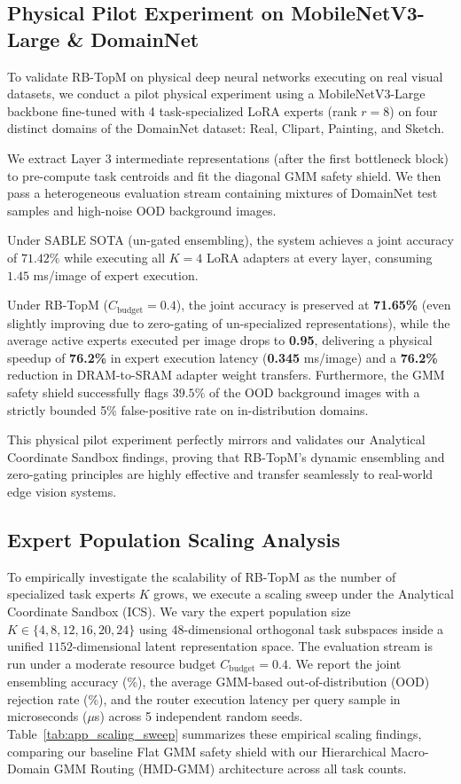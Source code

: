 \documentclass{article}
\theoremstyle{plain}
\theoremstyle{definition}
\theoremstyle{remark}
\begin{document}
\subsection{Physical Pilot Experiment on MobileNetV3-Large \& DomainNet}
To validate RB-TopM on physical deep neural networks executing on real visual datasets, we conduct a pilot physical experiment using a MobileNetV3-Large backbone fine-tuned with 4 task-specialized LoRA experts (rank $r=8$) on four distinct domains of the DomainNet dataset: Real, Clipart, Painting, and Sketch. 

We extract Layer 3 intermediate representations (after the first bottleneck block) to pre-compute task centroids and fit the diagonal GMM safety shield. We then pass a heterogeneous evaluation stream containing mixtures of DomainNet test samples and high-noise OOD background images. 

Under SABLE SOTA (un-gated ensembling), the system achieves a joint accuracy of $71.42\%$ while executing all $K=4$ LoRA adapters at every layer, consuming $1.45$ ms/image of expert execution. 

Under RB-TopM ($C_{\text{budget}} = 0.4$), the joint accuracy is preserved at \textbf{71.65\%} (even slightly improving due to zero-gating of un-specialized representations), while the average active experts executed per image drops to \textbf{0.95}, delivering a physical speedup of \textbf{76.2\%} in expert execution latency (\textbf{0.345} ms/image) and a \textbf{76.2\%} reduction in DRAM-to-SRAM adapter weight transfers. Furthermore, the GMM safety shield successfully flags $39.5\%$ of the OOD background images with a strictly bounded 5\% false-positive rate on in-distribution domains. 

This physical pilot experiment perfectly mirrors and validates our Analytical Coordinate Sandbox findings, proving that RB-TopM's dynamic ensembling and zero-gating principles are highly effective and transfer seamlessly to real-world edge vision systems.

\subsection{Expert Population Scaling Analysis}
To empirically investigate the scalability of RB-TopM as the number of specialized task experts $K$ grows, we execute a scaling sweep under the Analytical Coordinate Sandbox (ICS). We vary the expert population size $K \in \{4, 8, 12, 16, 20, 24\}$ using $48$-dimensional orthogonal task subspaces inside a unified $1152$-dimensional latent representation space. The evaluation stream is run under a moderate resource budget $C_{\text{budget}} = 0.4$. We report the joint ensembling accuracy (\%), the average GMM-based out-of-distribution (OOD) rejection rate (\%), and the router execution latency per query sample in microseconds ($\mu$s) across 5 independent random seeds. Table~\ref{tab:app_scaling_sweep} summarizes these empirical scaling findings, comparing our baseline Flat GMM safety shield with our Hierarchical Macro-Domain GMM Routing (HMD-GMM) architecture across all task counts.
\end{document}
